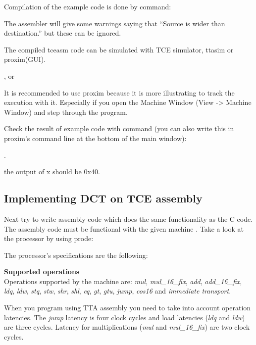 \documentclass[twoside]{tceusermanual}
\begin{document}
Compilation of the example code is done by command:


The assembler will give some warnings saying that ``Source is
wider than destination.'' but these can be ignored.

The compiled tceasm code can be simulated with TCE
simulator, ttasim or proxim(GUI).

 , or


It is recommended to use proxim because it is more illustrating to track the
execution with it. Especially if you open the Machine Window (View -> Machine
Window) and step through the program.

Check the result of example code with command (you can also write this in
proxim's command line at the bottom of the main window):

. 

the output of x should be 0x40.

\subsection{Implementing DCT on TCE assembly}

Next try to write assembly code which does the same functionality as the
C code. The assembly code must be functional with the given machine
\file{dct\_8x8\_16\_bit\_with\_sfus.adf}. Take a look at the processor by
using prode:


The processor's specifications are the following:

\textbf{Supported operations} \\
Operations supported by the machine are: \textit{mul}, \textit{mul\_16\_fix},
\textit{add}, \textit{add\_16\_fix}, \textit{ldq}, \textit{ldw}, \textit{stq},
\textit{stw}, \textit{shr}, \textit{shl}, \textit{eq}, \textit{gt},
\textit{gtu}, \textit{jump}, \textit{cos16} and \textit{immediate transport}.

When you program using TTA assembly you need to take into account 
operation latencies. The \textit{jump} latency is four clock cycles and load
latencies (\textit{ldq} and \textit{ldw}) are three cycles. Latency for
multiplications (\textit{mul} and \textit{mul\_16\_fix}) are two clock cycles.
\end{document}
